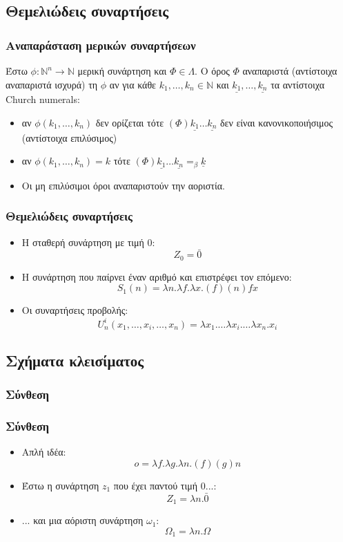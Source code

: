\documentclass{beamer}
\begin{document}
\subsection{Θεμελιώδεις συναρτήσεις}

\begin{frame}
  \frametitle{Αναπαράσταση μερικών συναρτήσεων}
  Έστω $\phi : \mathbb{N}^n \rightarrow \mathbb{N}$ μερική συνάρτηση
  και $\Phi \in \Lambda $. O όρος $\Phi$ αναπαριστά (αντίστοιχα
  αναπαριστά ισχυρά) τη $\phi$ αν για κάθε $k_1,\ldots, k_n \in
  \mathbb{N}$ και $ \underline{k_1}, \ldots, \underline{k_n}$ τα
  αντίστοιχα Church numerals: \pause
  \begin{itemize}
  \item αν $\phi(k_1,\ldots,k_n)$ δεν ορίζεται τότε $(\Phi)
    \underline{k_1} \ldots \underline{k_n}$ δεν είναι
    κανονικοποιήσιμος (αντίστοιχα επιλύσιμος) \pause
  \item αν $\phi(k_1,\ldots,k_n) = k$ τότε $(\Phi) \underline{k_1}
    \ldots \underline{k_n} =_\beta \underline{k}$ \pause
  \item Οι μη επιλύσιμοι όροι αναπαριστούν την αοριστία.
  \end{itemize}
\end{frame}

\begin{frame}
  \frametitle{Θεμελιώδεις συναρτήσεις}
  \begin{itemize}
  \item Η σταθερή συνάρτηση με τιμή 0:
    $$Z_0=\bar{0}$$
    \pause
  \item Η συνάρτηση που παίρνει έναν αριθμό και επιστρέφει τον
    επόμενο:
    $$S_1(n)=\lambda n . \lambda f . \lambda x . (f) (n) f x$$
    \pause
  \item Οι συναρτήσεις προβολής: $$U^i_n(x_1,\ldots,x_i,\ldots,x_n)=
    \lambda x_1 . \ldots \lambda x_i . \ldots \lambda x_n . x_i$$
  \end{itemize}
\end{frame}

\subsection{Σχήματα κλεισίματος}

\subsubsection{Σύνθεση}

\begin{frame}
  \frametitle{Σύνθεση}
  \begin{itemize}
  \item Απλή ιδέα: $$o = \lambda f. \lambda g. \lambda n . (f) (g) n$$
    \pause
  \item Έστω η συνάρτηση $z_1$ που έχει παντού τιμή 0...:
    $$Z_1 = \lambda n. \bar{0}$$ \pause
  \item ... και μια αόριστη συνάρτηση $\omega_1$:
    $$\Omega_1 = \lambda n. \Omega$$
  \end{itemize}
\end{frame}
\end{document}
